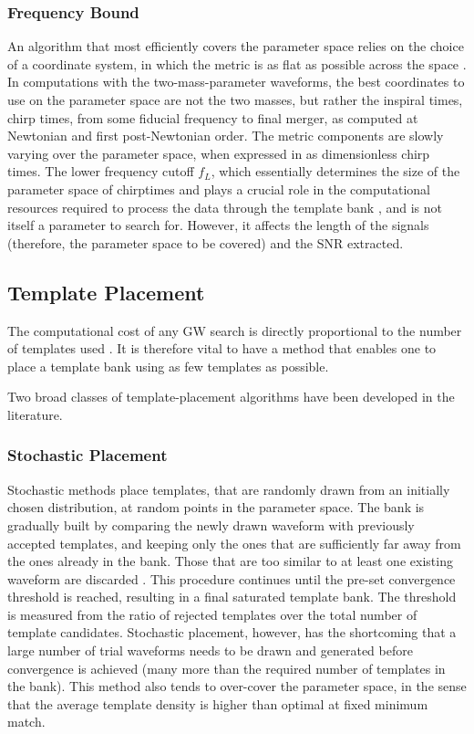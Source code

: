 \documentclass[binding=0.6cm, LaM]{sapthesis}
\begin{document}
\subsubsection{Frequency Bound}
	An algorithm that most efficiently covers the parameter space relies on the choice of a coordinate system, 
	in which the metric is as flat as possible across the space \cite{34}.
	In computations with the two-mass-parameter waveforms, 
	the best coordinates to use on the parameter space are not the two masses, 
	but rather the inspiral times, chirp times, from some fiducial frequency to final merger, 
	as computed at Newtonian and first post-Newtonian order. 
	The metric components are slowly varying over the parameter space, 
	when expressed in as dimensionless chirp times. 
        The lower frequency cutoff $f_L$, which essentially determines the size of the parameter space
        of chirptimes and plays a crucial role in the computational resources required
        to process the data through the template bank \cite{30}, and is not itself a parameter to search for.
        However, it affects the length of the signals
        (therefore, the parameter space to be covered) and the SNR extracted.

\subsection{Template Placement}
	The computational cost of any GW search
        is directly proportional to the number of templates used \cite{28}.
	It is therefore vital to have a method that enables one 
	to place a template bank using as few templates as possible.

	Two broad classes of template-placement algorithms 
	have been developed in the literature. 

\subsubsection{Stochastic Placement}
	Stochastic methods place templates, 
	that are randomly drawn from an initially chosen distribution, 
	at random points in the parameter space.
	The bank is gradually built by comparing the newly drawn waveform
	with previously accepted templates, 
	and keeping only the ones that are sufficiently far away 
	from the ones already in the bank.
 	Those that are too similar to at least one existing waveform are discarded \cite{35}.
	This procedure continues until the pre-set convergence threshold is reached, 
	resulting in a final saturated template bank.
	The threshold is measured from the ratio of rejected templates over the total number of template candidates.
	Stochastic placement, however, has the shortcoming that 
	a large number of trial waveforms needs to be drawn and generated before convergence is achieved 
	(many more than the required number of templates in the bank). 
	This method also tends to over-cover the parameter space, 
	in the sense that the average template density is higher than optimal at fixed minimum match.
\end{document}
